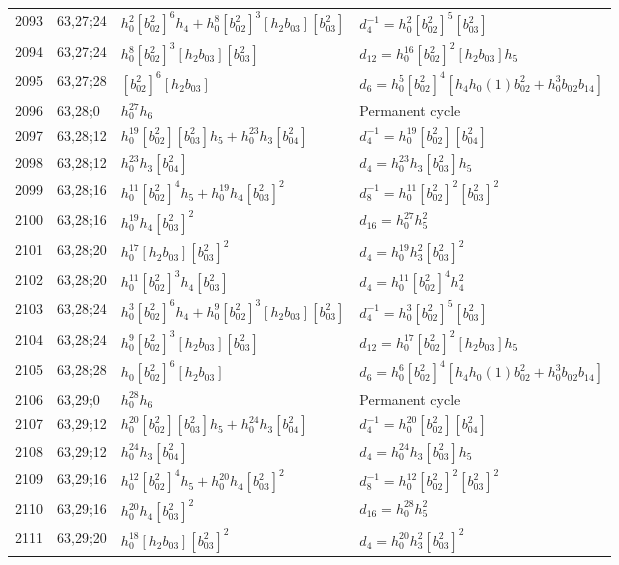 \documentclass{article}
\begin{document}
\begin{longtable}{|l|l|>{\raggedright\arraybackslash}p{6cm}|>{\raggedright\arraybackslash}p{6cm}|}
2093 & 63,27;24 & $h_0^2[b_{02}^2]^6h_4 + h_0^8[b_{02}^2]^3[h_2b_{03}][b_{03}^2]$ & $d_{4}^{-1}=h_0^2[b_{02}^2]^5[b_{03}^2]$\\
2094 & 63,27;24 & $h_0^8[b_{02}^2]^3[h_2b_{03}][b_{03}^2]$ &$d_{12}=h_0^{16}[b_{02}^2]^2[h_2b_{03}]h_5$\\
\hline
2095 & 63,27;28 & $[b_{02}^2]^6[h_2b_{03}]$ &$d_{6}=h_0^5[b_{02}^2]^4[h_4h_0(1)b_{02}^2 + h_0^3b_{02}b_{14}]$\\
\hline
2096 & 63,28;0 & $h_0^{27}h_6$ & Permanent cycle\\
\hline
2097 & 63,28;12 & $h_0^{19}[b_{02}^2][b_{03}^2]h_5 + h_0^{23}h_3[b_{04}^2]$ & $d_{4}^{-1}=h_0^{19}[b_{02}^2][b_{04}^2]$\\
2098 & 63,28;12 & $h_0^{23}h_3[b_{04}^2]$ &$d_{4}=h_0^{23}h_3[b_{03}^2]h_5$\\
\hline
2099 & 63,28;16 & $h_0^{11}[b_{02}^2]^4h_5 + h_0^{19}h_4[b_{03}^2]^2$ & $d_{8}^{-1}=h_0^{11}[b_{02}^2]^2[b_{03}^2]^2$\\
2100 & 63,28;16 & $h_0^{19}h_4[b_{03}^2]^2$ &$d_{16}=h_0^{27}h_5^2$\\
\hline
2101 & 63,28;20 & $h_0^{17}[h_2b_{03}][b_{03}^2]^2$ &$d_{4}=h_0^{19}h_3^2[b_{03}^2]^2$\\
2102 & 63,28;20 & $h_0^{11}[b_{02}^2]^3h_4[b_{03}^2]$ &$d_{4}=h_0^{11}[b_{02}^2]^4h_4^2$\\
\hline
2103 & 63,28;24 & $h_0^3[b_{02}^2]^6h_4 + h_0^9[b_{02}^2]^3[h_2b_{03}][b_{03}^2]$ & $d_{4}^{-1}=h_0^3[b_{02}^2]^5[b_{03}^2]$\\
2104 & 63,28;24 & $h_0^9[b_{02}^2]^3[h_2b_{03}][b_{03}^2]$ &$d_{12}=h_0^{17}[b_{02}^2]^2[h_2b_{03}]h_5$\\
\hline
2105 & 63,28;28 & $h_0[b_{02}^2]^6[h_2b_{03}]$ &$d_{6}=h_0^6[b_{02}^2]^4[h_4h_0(1)b_{02}^2 + h_0^3b_{02}b_{14}]$\\
\hline
2106 & 63,29;0 & $h_0^{28}h_6$ & Permanent cycle\\
\hline
2107 & 63,29;12 & $h_0^{20}[b_{02}^2][b_{03}^2]h_5 + h_0^{24}h_3[b_{04}^2]$ & $d_{4}^{-1}=h_0^{20}[b_{02}^2][b_{04}^2]$\\
2108 & 63,29;12 & $h_0^{24}h_3[b_{04}^2]$ &$d_{4}=h_0^{24}h_3[b_{03}^2]h_5$\\
\hline
2109 & 63,29;16 & $h_0^{12}[b_{02}^2]^4h_5 + h_0^{20}h_4[b_{03}^2]^2$ & $d_{8}^{-1}=h_0^{12}[b_{02}^2]^2[b_{03}^2]^2$\\
2110 & 63,29;16 & $h_0^{20}h_4[b_{03}^2]^2$ &$d_{16}=h_0^{28}h_5^2$\\
\hline
2111 & 63,29;20 & $h_0^{18}[h_2b_{03}][b_{03}^2]^2$ &$d_{4}=h_0^{20}h_3^2[b_{03}^2]^2$\\

\end{longtable}
\end{document}
